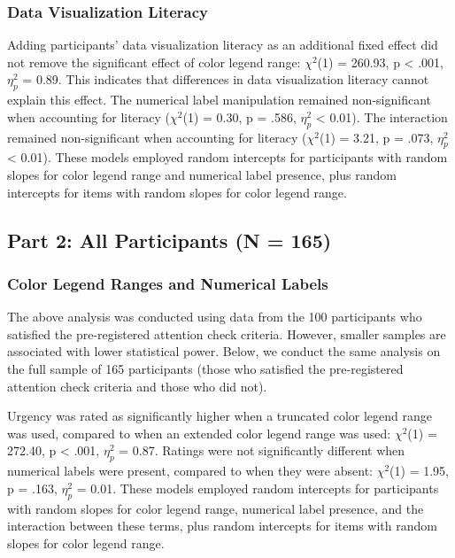 \documentclass[
]{interact}
\begin{document}
\hypertarget{data-visualization-literacy}{%
\subsubsection{Data Visualization
Literacy}\label{data-visualization-literacy}}

Adding participants' data visualization literacy as an additional fixed
effect did not remove the significant effect of color legend range:
\(\chi^2\)(1) = 260.93, p \textless{} .001, \(\eta_p^2\) = 0.89. This
indicates that differences in data visualization literacy cannot explain
this effect. The numerical label manipulation remained non-significant
when accounting for literacy (\(\chi^2\)(1) = 0.30, p = .586,
\(\eta_p^2\) \textless{} 0.01). The interaction remained non-significant
when accounting for literacy (\(\chi^2\)(1) = 3.21, p = .073,
\(\eta_p^2\) \textless{} 0.01). These models employed random intercepts
for participants with random slopes for color legend range and numerical
label presence, plus random intercepts for items with random slopes for
color legend range.

\hypertarget{part-2-all-participants-n-165}{%
\subsection{Part 2: All Participants (N =
165)}\label{part-2-all-participants-n-165}}

\hypertarget{color-legend-ranges-and-numerical-labels-1}{%
\subsubsection{Color Legend Ranges and Numerical
Labels}\label{color-legend-ranges-and-numerical-labels-1}}

The above analysis was conducted using data from the 100 participants
who satisfied the pre-registered attention check criteria. However,
smaller samples are associated with lower statistical power. Below, we
conduct the same analysis on the full sample of 165 participants (those
who satisfied the pre-registered attention check criteria and those who
did not).

Urgency was rated as significantly higher when a truncated color legend
range was used, compared to when an extended color legend range was
used: \(\chi^2\)(1) = 272.40, p \textless{} .001, \(\eta_p^2\) = 0.87.
Ratings were not significantly different when numerical labels were
present, compared to when they were absent: \(\chi^2\)(1) = 1.95, p =
.163, \(\eta_p^2\) = 0.01. These models employed random intercepts for
participants with random slopes for color legend range, numerical label
presence, and the interaction between these terms, plus random
intercepts for items with random slopes for color legend range.
\end{document}
